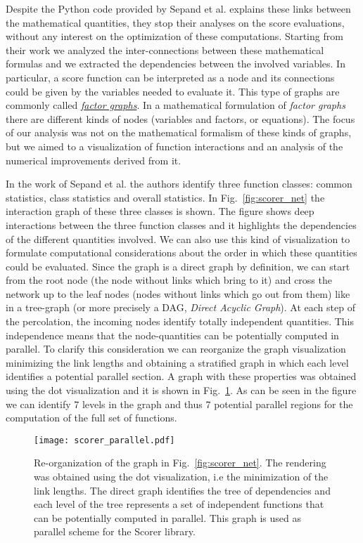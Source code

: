 \documentclass{standalone}
\begin{document}
Despite the \textsf{Python} code provided by Sepand et al. explains these links between the mathematical quantities, they stop their analyses on the score evaluations, without any interest on the optimization of these computations.
Starting from their work we analyzed the inter-connections between these mathematical formulas and we extracted the dependencies between the involved variables.
In particular, a score function can be interpreted as a node and its connections could be given by the variables needed to evaluate it.
This type of graphs are commonly called \href{https://en.wikipedia.org/wiki/Factor_graph}{\emph{factor graphs}}.
In a mathematical formulation of \emph{factor graphs} there are different kinds of nodes (variables and factors, or equations).
The focus of our analysis was not on the mathematical formalism of these kinds of graphs, but we aimed to a visualization of function interactions and an analysis of the numerical improvements derived from it.

In the work of Sepand et al. the authors identify three function classes: common statistics, class statistics and overall statistics.
In Fig.~\ref{fig:scorer_net} the interaction graph of these three classes is shown.
The figure shows deep interactions between the three function classes and it highlights the dependencies of the different quantities involved.
We can also use this kind of visualization to formulate computational considerations about the order in which these quantities could be evaluated.
Since the graph is a direct graph by definition, we can start from the root node (the node without links which bring to it) and cross the network up to the leaf nodes (nodes without links which go out from them) like in a tree-graph (or more precisely a DAG, \emph{Direct Acyclic Graph}).
At each step of the percolation, the incoming nodes identify totally independent quantities.
This independence means that the node-quantities can be potentially computed in parallel.
To clarify this consideration we can reorganize the graph visualization minimizing the link lengths and obtaining a stratified graph in which each level identifies a potential parallel section.
A graph with these properties was obtained using the \textsf{dot} visualization and it is shown in Fig.~\ref{fig:scorer_parallel}.
As can be seen in the figure we can identify 7 levels in the graph and thus 7 potential parallel regions for the computation of the full set of functions.

\begin{center}
\begin{figure}[htbp]
\hspace{-2cm}
\texttt{[image: scorer\_parallel.pdf]}
\caption{Re-organization of the graph in Fig.~\ref{fig:scorer_net}.
The rendering was obtained using the \textsf{dot} visualization, i.e the minimization of the link lengths.
The direct graph identifies the tree of dependencies and each level of the tree represents a set of independent functions that can be potentially computed in parallel.
This graph is used as parallel scheme for the \textsf{Scorer} library.
}
\label{fig:scorer_parallel}
\end{figure}
\end{center}
\end{document}
